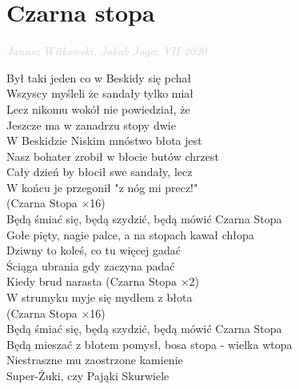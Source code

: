 \documentclass[a5paper, 10pt]{book}
\begin{document}
\section{Czarna stopa}\textcolor{lightgray}{\textit{Janusz Witkowski, Jakub Jugo; VII 2020}}\vspace*{1.5mm}\\
\begin{minipage}[t]{0.9\textwidth}
Był taki jeden co w Beskidy się pchał\\
Wszyscy myśleli że sandały tylko miał\\
Lecz nikomu wokół nie powiedział, że\\
Jeszcze ma w zanadrzu stopy dwie \vspace*{1.5mm}
\\
W Beskidzie Niskim mnóstwo błota jest\\
Nasz bohater zrobił w błocie butów chrzest\\
Cały dzień by błocił swe sandały, lecz\\
W końcu je przegonił "z nóg mi precz!" \vspace*{1.5mm}
\\
\hspace*{5mm}(Czarna Stopa $\times$16)\\
\hspace*{5mm}Będą śmiać się, będą szydzić, będą mówić Czarna Stopa\\
\hspace*{5mm}Gołe pięty, nagie palce, a na stopach kawał chłopa \vspace*{1.5mm}
\\
Dziwny to koleś, co tu więcej gadać\\
Ściąga ubrania gdy zaczyna padać\\
Kiedy brud narasta (Czarna Stopa $\times$2)\\
W strumyku myje się mydłem z błota \vspace*{1.5mm}
\\
\hspace*{5mm}(Czarna Stopa $\times$16)\\
\hspace*{5mm}Będą śmiać się, będą szydzić, będą mówić Czarna Stopa\\
\hspace*{5mm}Będą mieszać z błotem pomysł, bosa stopa - wielka wtopa \vspace*{1.5mm}
\\
Niestraszne mu zaostrzone kamienie\\
Super-Żuki, czy Pająki Skurwiele\\

\end{minipage}
\end{document}
